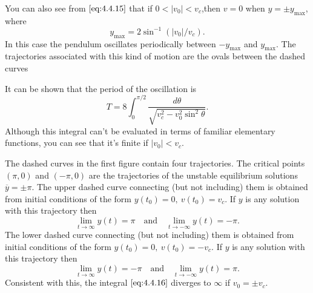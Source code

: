 \documentclass{ximera}
\begin{document}
\begin{example}
 
 
You can also see from
$\eqref{eq:4.4.15}$ that if $0<|v_0|<v_c$,then $v=0$ when $y=\pm y_{\max}$,
where
$$
y_{\max}=2\sin^{-1}(|v_0|/v_c).
$$
In this case the pendulum oscillates periodically between $-y_{\max}$
and $y_{\max}$. The
trajectories associated with this kind of motion are the ovals between
the dashed curves

 
 
It can be shown %
that the period of the
oscillation is
\begin{equation}\label{eq:4.4.16}
T=8\int_0^{\pi/2}\frac{d\theta}{\sqrt{v_c^2-v_0^2\sin^2\theta}}.
\end{equation}
Although this integral can't be evaluated in terms of familiar
elementary functions, you can see that it's finite if $|v_0|<v_c$.
 
The dashed curves in the first figure contain four
trajectories. The critical points $(\pi,0)$ and $(-\pi,0)$ are the
trajectories of the unstable equilibrium solutions $\overline
y=\pm\pi$.
The upper dashed curve connecting (but not including) them is obtained
from initial conditions of the form $y(t_0)=0,\ v(t_0)=v_c$. If $y$ is
any solution with this trajectory then
$$
\lim_{t\rightarrow\infty}y(t)=\pi\quad\mbox{and}\quad\lim_{t\rightarrow-\infty}y(t)=-\pi.
$$
The lower dashed curve connecting (but not including) them is obtained
from initial conditions of the form $y(t_0)=0,\ v(t_0)=-v_c$. If $y$
is any solution with this trajectory then
$$
\lim_{t\rightarrow\infty}y(t)=-\pi\quad\mbox{and}\quad\lim_{t\rightarrow-\infty}y(t)=\pi.
$$
Consistent with this, the integral $\eqref{eq:4.4.16}$ diverges to $\infty$
if $v_0=\pm v_c$. %
 

\end{example}
\end{document}
